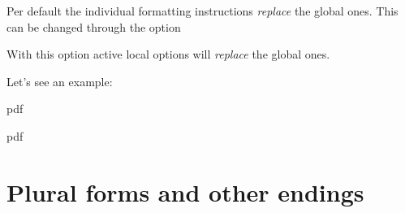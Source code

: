 \documentclass{acro-manual}
\begin{document}
Per default the individual formatting instructions
\emph{replace} the global ones. This can be changed through the option
\begin{options}
    With this option active local options will \emph{replace} the global
    ones.
\end{options}

Let's see an example:
\begin{sourcecode}
\end{sourcecode}
\begin{example}
  \acf{pdf} \par
  \acf{pdf}
\end{example}

\section{Plural forms and other endings}\label{sec:plural-forms-other}
\end{document}
